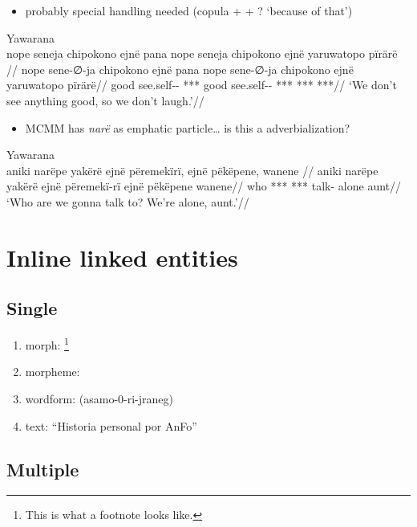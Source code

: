 \documentclass{memoir}
\begin{document}
\begin{itemize}
\tightlist
\item
  probably special handling needed (copula +  + ? `because of
  that')
\end{itemize}

\ex Yawarana \\
\label{convrisamaj-29}    \begingl
    \glpreamble  nope seneja chipokono ejnë pana nope seneja chipokono ejnë yaruwatopo pïrärë //
    \gla nope sene-∅-ja chipokono ejnë pana nope sene-∅-ja chipokono ejnë yaruwatopo pïrärë//
    \glb good see.self-- ***   good see.self-- ***  *** ***//
        \glft ‘We don’t see anything good, so we don’t laugh.’//  
    \endgl 
\xe

\begin{itemize}
\tightlist
\item
  MCMM has \emph{narë} as emphatic particle\ldots{} is this a
  adverbialization?
\end{itemize}

\ex Yawarana \\
\label{convrisamaj-47}    \begingl
    \glpreamble  aniki narëpe yakërë ejnë përemekïrï, ejnë pëkëpene, wanene //
    \gla aniki narëpe yakërë ejnë përemekï-rï ejnë pëkëpene wanene//
    \glb who *** ***  talk-  alone aunt//
        \glft ‘Who are we gonna talk to? We’re alone, aunt.’//  
    \endgl 
\xe

\section{Inline linked entities}

\subsection{Single}

\begin{enumerate}
\def\labelenumi{\arabic{enumi}.}
\tightlist
\item
  morph: \footnote{This is what a footnote looks like.}
\item
  morpheme: 
\item
  wordform: (asamo-0-ri-jraneg)
\item
  text: ``Historia personal por AnFo''
\end{enumerate}

\subsection{Multiple}
\end{document}

